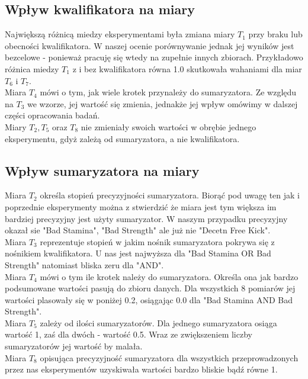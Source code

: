 \documentclass{classrep}
\begin{document}
\subsection{Wpływ kwalifikatora na miary}
Największą różnicą miedzy eksperymentami była zmiana miary $T_1$ przy braku lub obecności kwalifikatora. W naszej ocenie porównywanie jednak jej wyników jest bezcelowe - ponieważ pracuję się wtedy na zupełnie innych zbiorach. Przykładowo różnica miedzy $T_1$ z i bez kwalifikatora równa 1.0 skutkowała wahaniami dla miar $T_6$ i $T_7$. \\
\newline
Miara $T_4$ mówi o tym, jak wiele krotek przynależy do sumaryzatora. Ze względu na $T_3$ we wzorze, jej wartość się zmienia, jednakże jej wpływ omówimy w dalszej części opracowania badań.\\
\newline
Miary $T_2, T_5$ oraz $T_8$ nie zmieniały swoich wartości w obrębie jednego eksperymentu, gdyż zależą od sumaryzatora, a nie kwalifikatora. 
\subsection{Wpływ sumaryzatora na miary}
Miara $T_2$ określa stopień precyzyjności sumaryzatora. Biorąć pod uwagę ten jak i poprzednie eksperymenty można z stwierdzić że miara jest tym większa im bardziej precyzyjny jest użyty sumaryzator. W naszym przypadku precyzyjny okazał sie "Bad Stamina", "Bad Strength" ale już nie "Decetn Free Kick".\\
\newline
Miara $T_3$ reprezentuje stopień w jakim nośnik sumaryzatora pokrywa się z nośnikiem kwalifikatora. U nas jest najwyższa dla "Bad Stamina OR Bad Strength" natomiast bliska zeru dla "AND".\\
\newline
Miara $T_4$ mówi o tym ile krotek należy do sumaryzatora. Określa ona jak bardzo podsumowane wartości pasują do zbioru danych. Dla wszystkich 8 pomiarów jej wartości plasowały się w poniżej 0.2, osiągając 0.0 dla "Bad Stamina AND Bad Strength".\\
\newline
Miara $T_5$ zależy od ilości sumaryzatorów. Dla jednego sumaryzatora osiąga wartość 1, zaś dla dwóch - wartość 0.5. Wraz ze zwiększeniem liczby sumaryzatorów jej wartość by malała.\\
\newline
Miara $T_8$ opisująca precyzyjność sumaryzatora dla wszystkich przeprowadzonych przez nas eksperymentów uzyskiwała wartości bardzo bliskie bądź równe 1. 
\end{document}
